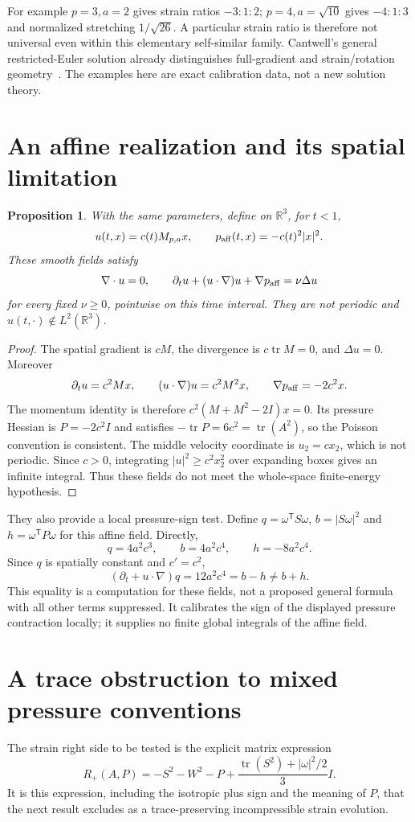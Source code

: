 \documentclass[11pt]{article}
\newtheorem{proposition}[theorem]{Proposition}
\newcommand{\R}{\mathbb R}\newcommand{\tr}{\operatorname{tr}}
\begin{document}
For example $p=3,a=2$ gives strain ratios $-3:1:2$; $p=4,a=\sqrt{10}$
gives $-4:1:3$ and normalized stretching $1/\sqrt{26}$. A particular
strain ratio is therefore not universal even within this elementary
self-similar family. Cantwell's general restricted-Euler solution already
distinguishes full-gradient and strain/rotation geometry~\cite{Cantwell}.
The examples here are exact calibration data, not a new solution theory.

\section{An affine realization and its spatial limitation}
\begin{proposition}\label{prop:affine}
With the same parameters, define on $\R^3$, for $t<1$,
\[
 u(t,x)=c(t)M_{p,a}x,\qquad p_{\rm aff}(t,x)=-c(t)^2|x|^2.
\]
These smooth fields satisfy
\[
 \nabla\cdot u=0,\qquad
 \partial_tu+(u\cdot\nabla)u+\nabla p_{\rm aff}=\nu\Delta u
\]
for every fixed $\nu\geq0$, pointwise on this time interval. They are
not periodic and $u(t,\cdot)\notin L^2(\R^3)$.
\end{proposition}
\begin{proof}
The spatial gradient is $cM$, the divergence is $c\tr M=0$, and
$\Delta u=0$. Moreover
\[
 \partial_tu=c^2Mx,\qquad
 (u\cdot\nabla)u=c^2M^2x,\qquad \nabla p_{\rm aff}=-2c^2x.
\]
The momentum identity is therefore $c^2(M+M^2-2I)x=0$.
Its pressure Hessian is $P=-2c^2I$ and satisfies
$-\tr P=6c^2=\tr(A^2)$, so the Poisson convention is consistent.
The middle velocity coordinate is $u_2=c x_2$, which is not periodic.
Since $c>0$, integrating $|u|^2\geq c^2x_2^2$ over expanding boxes
gives an infinite integral. Thus these fields do not meet the
whole-space finite-energy hypothesis.
\end{proof}

They also provide a local pressure-sign test. Define
$q=\omega^{\mathsf T}S\omega$, $b=|S\omega|^2$ and
$h=\omega^{\mathsf T}P\omega$ for this affine field. Directly,
\[
 q=4a^2c^3,\qquad b=4a^2c^4,\qquad h=-8a^2c^4.
\]
Since $q$ is spatially constant and $c'=c^2$,
\[
 (\partial_t+u\cdot\nabla)q=12a^2c^4=b-h\ne b+h.
\]
This equality is a computation for these fields, not a proposed general
formula with all other terms suppressed. It calibrates the sign of the
displayed pressure contraction locally; it supplies no finite global
integrals of the affine field.

\section{A trace obstruction to mixed pressure conventions}
The strain right side to be tested is the explicit matrix expression
\begin{equation}\label{eq:bad}
 R_+(A,P)=-S^2-W^2-P+
 \frac{\tr(S^2)+|\omega|^2/2}{3}I.
\end{equation}
It is this expression, including the isotropic plus sign and the
meaning of $P$, that the next result excludes as a trace-preserving
incompressible strain evolution.
\end{document}
